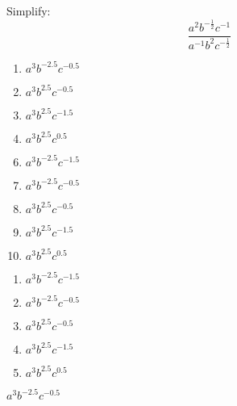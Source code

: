 



 Simplify: \[\frac{a^{2}b^{-\frac{1}{2}}c^{-1}}{a^{-1}b^{2}c^{-\frac{1}{2}}}\]


\ifsat
	\begin{enumerate}[label=\Alph*)]
		\item  $a^{3}b^{-2.5}c^{-0.5}$%
		\item  $a^{3}b^{2.5}c^{-0.5}$
		\item  $a^{3}b^{2.5}c^{-1.5}$
		\item  $a^{3}b^{2.5}c^{0.5}$
	\end{enumerate}
\else
\fi

\ifacteven
	\begin{enumerate}[label=\textbf{\Alph*.},itemsep=\fill,align=left]
		\setcounter{enumii}{5}
		\item  $a^{3}b^{-2.5}c^{-1.5}$
		\item  $a^{3}b^{-2.5}c^{-0.5}$%
		\item  $a^{3}b^{2.5}c^{-0.5}$
		\addtocounter{enumii}{1}
		\item  $a^{3}b^{2.5}c^{-1.5}$
		\item  $a^{3}b^{2.5}c^{0.5}$
	\end{enumerate}
\else
\fi

\ifactodd
	\begin{enumerate}[label=\textbf{\Alph*.},itemsep=\fill,align=left]
		\item  $a^{3}b^{-2.5}c^{-1.5}$
		\item  $a^{3}b^{-2.5}c^{-0.5}$%
		\item  $a^{3}b^{2.5}c^{-0.5}$
		\item  $a^{3}b^{2.5}c^{-1.5}$
		\item  $a^{3}b^{2.5}c^{0.5}$
	\end{enumerate}
\else
\fi

\ifgridin
  $a^{3}b^{-2.5}c^{-0.5}$%
		
\else
\fi

